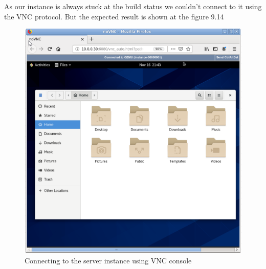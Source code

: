 \begin{spacing}{1.2}
\par As our instance is always stuck at the build status we couldn't connect to it using the VNC protocol. But the expected result is shown at the figure 9.14
\begin{figure}[!htb] 
\begin{center} 
\includegraphics[width=1\linewidth]{Cloud/Creating and Running Instances/C_2_excpected_result_for_us_it_didn't work because of C_1.png} 
\end{center} 
\caption{Connecting to the server instance using VNC console} 
\end{figure} 
\FloatBarrier

\end{spacing}